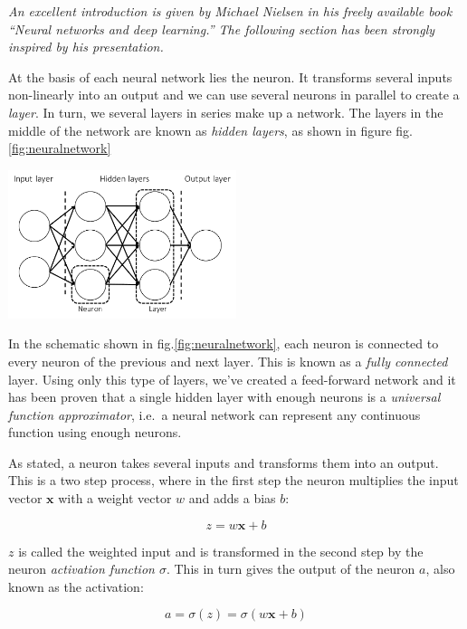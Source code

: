 \documentclass[12pt,a4paper,]{Dissertate}
\let\origfigure\figure
\let\endorigfigure\endfigure
\renewenvironment{figure}[1][2] {
    \expandafter\origfigure\expandafter[H]
} {
    \endorigfigure
}
\begin{document}
\emph{An excellent introduction is given by Michael Nielsen in his
freely available book ``Neural networks and deep learning.'' The
following section has been strongly inspired by his presentation.}

At the basis of each neural network lies the neuron. It transforms
several inputs non-linearly into an output and we can use several
neurons in parallel to create a \emph{layer}. In turn, we several layers
in series make up a network. The layers in the middle of the network are
known as \emph{hidden layers}, as shown in figure
fig.\ref{fig:neuralnetwork}

\begin{figure}
\centering
\includegraphics[width=0.5\textwidth,height=\textheight]{source/figures/pdf/neuralnetwork.pdf}
\caption{Schematic view of a neural network.}
\end{figure}

In the schematic shown in fig.\ref{fig:neuralnetwork}, each neuron is
connected to every neuron of the previous and next layer. This is known
as a \emph{fully connected} layer. Using only this type of layers, we've
created a feed-forward network and it has been proven that a single
hidden layer with enough neurons is a \emph{universal function
approximator}, i.e.~a neural network can represent any continuous
function using enough neurons.

As stated, a neuron takes several inputs and transforms them into an
output. This is a two step process, where in the first step the neuron
multiplies the input vector \(\mathbf{x}\) with a weight vector \(w\)
and adds a bias \(b\):

\begin{equation}
z = w\mathbf{x}+b
\label{eq:weighted_input}\end{equation}

\(z\) is called the weighted input and is transformed in the second step
by the neuron \emph{activation function \(\sigma\)}. This in turn gives
the output of the neuron \(a\), also known as the activation:

\begin{equation}
a = \sigma(z) = \sigma(w\mathbf{x}+b)
\label{eq:activation}\end{equation}
\end{document}
